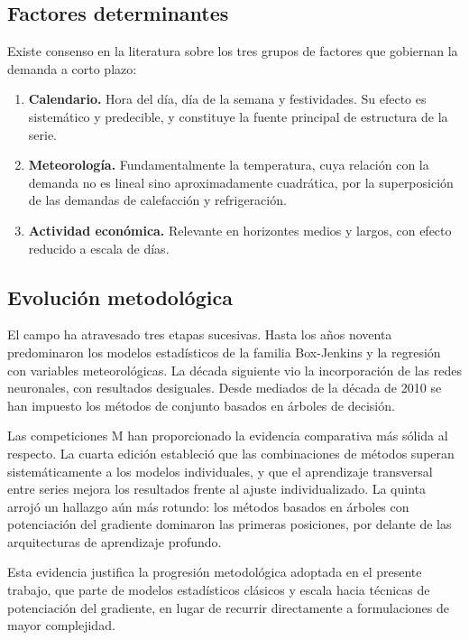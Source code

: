 \subsection*{Factores determinantes}

Existe consenso en la literatura sobre los tres grupos de factores que gobiernan
la demanda a corto plazo:

\begin{enumerate}
  \item \textbf{Calendario.} Hora del día, día de la semana y festividades. Su
        efecto es sistemático y predecible, y constituye la fuente principal de
        estructura de la serie.

  \item \textbf{Meteorología.} Fundamentalmente la temperatura, cuya relación con
        la demanda no es lineal sino aproximadamente cuadrática, por la
        superposición de las demandas de calefacción y refrigeración.

  \item \textbf{Actividad económica.} Relevante en horizontes medios y largos,
        con efecto reducido a escala de días.
\end{enumerate}

\subsection*{Evolución metodológica}

El campo ha atravesado tres etapas sucesivas. Hasta los años noventa
predominaron los modelos estadísticos de la familia Box-Jenkins
\parencite{boxjenkins} y la regresión con variables meteorológicas. La década
siguiente vio la incorporación de las redes neuronales, con resultados desiguales.
Desde mediados de la década de 2010 se han impuesto los métodos de conjunto
basados en árboles de decisión.

Las competiciones M han proporcionado la evidencia comparativa más sólida al
respecto. La cuarta edición \parencite{makridakis2020m4} estableció que las
combinaciones de métodos superan sistemáticamente a los modelos individuales, y
que el aprendizaje transversal entre series mejora los resultados frente al ajuste
individualizado. La quinta \parencite{makridakis2022m5} arrojó un hallazgo aún
más rotundo: los métodos basados en árboles con potenciación del gradiente
dominaron las primeras posiciones, por delante de las arquitecturas de aprendizaje
profundo.

Esta evidencia justifica la progresión metodológica adoptada en el presente
trabajo, que parte de modelos estadísticos clásicos y escala hacia técnicas de
potenciación del gradiente, en lugar de recurrir directamente a formulaciones de
mayor complejidad.


